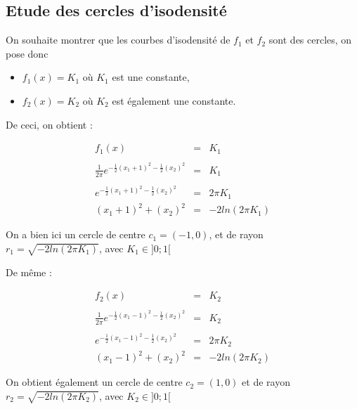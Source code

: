 \documentclass[a4paper,11pt]{article}
\begin{document}
\subsection{Etude des cercles d'isodensité}

\noindent On souhaite montrer que les courbes d'isodensité de $f_1$ et $f_2$ sont des cercles, on pose donc 
\begin{itemize}
\item $f_1(x) = K_1$ où $K_1$ est une constante,
\item $f_2(x) = K_2$ où $K_2$ est également une constante. \\
\end{itemize}

\noindent De ceci, on obtient : 

\begin{center}
   $$ 
   \begin{array}{rcl}
   f_1(x)   &=&  K_1 \\  \\
   \displaystyle \frac{1}{2 \pi}    e^{-\frac{1}{2} (x_1 +1)^2 - \frac{1}{2} (x_2)^2} &=& K_1 \\ \\
	\displaystyle e^{-\frac{1}{2} (x_1 +1)^2 - \frac{1}{2} (x_2)^2}   &=&  2 \pi K_1\\
	(x_1 +1)^2 + (x_2)^2 &=& -2ln(2 \pi K_1)
	       \end{array}
   $$
\end{center}

\noindent On a bien ici un cercle de centre $c_1 = (-1,0)$, et de rayon $r_1 = \sqrt{-2ln(2 \pi K_1)}$, avec $K_1 \in ]0;1[$

\noindent De même : 

\begin{center}
   $$ 
   \begin{array}{rcl}
   f_2(x)   &=&  K_2 \\  \\
   \displaystyle \frac{1}{2 \pi}    e^{-\frac{1}{2} (x_1 -1)^2 - \frac{1}{2} (x_2)^2} &=& K_2 \\ \\
   \displaystyle e^{-\frac{1}{2} (x_1 - 1)^2 - \frac{1}{2} (x_2)^2}   &=&  2 \pi K_2\\
	(x_1 -1)^2 + (x_2)^2 &=& -2ln(2 \pi K_2)
	       \end{array}
   $$
\end{center}

\noindent On obtient également un cercle de centre $c_2 = (1,0)$ et de rayon $r_2 = \sqrt{-2ln(2 \pi K_2)}$, avec $K_2 \in ]0;1[$
\end{document}
